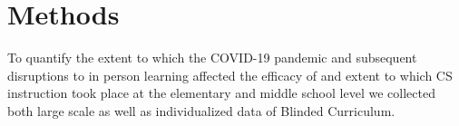 \documentclass[sigconf,manuscript,review,anonymous]{acmart} %
\def\ts{TIPP\&SEE}
\def\cvd{COVID-19}
\def\umc{Use\begin{math}\rightarrow\end{math}Modify\begin{math}\rightarrow\end{math}Create\ }
\newcommand{\pratham}[1]{\textcolor{orange}{\textit{Pratham: #1}}}
\newcommand{\Scratchencore}[0]{Blinded Curriculum}
\begin{document}




\section{Methods}
\label{sec:methods}
To quantify the extent to which the \cvd{} pandemic and subsequent disruptions to in
person learning affected the efficacy of and extent to which CS instruction took place at the elementary and middle school level we collected both large scale as well as individualized data of \Scratchencore{}.
\end{document}
